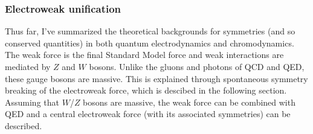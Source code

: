 \subsubsection{Electroweak unification}
Thus far, I've summarized the theoretical backgrounds for symmetries (and so conserved quantities) in both quantum electrodynamics and chromodynamics. The weak force is the final Standard Model force and weak interactions are mediated by $Z$ and $W$ bosons. Unlike the gluons and photons of QCD and QED, these gauge bosons are massive. This is explained through spontaneous symmetry breaking of the electroweak force, which is descibed in the following section. Assuming that $W$/$Z$ bosons are massive, the weak force can be combined with QED and a central electroweak force (with its associated symmetries) can be described. 

